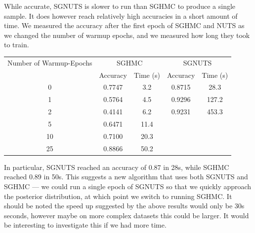 While accurate, SGNUTS is slower to run than SGHMC to produce a single sample. It does however reach relatively high accuracies in a short amount of time. We measured the accuracy after the first epoch of SGHMC and NUTS as we changed the number of warmup epochs, and we measured how long they took to train.

\begin{center}
\begin{tabular}{ccccc} 
\hline
Number of Warmup-Epochs &\multicolumn{2}{c}{SGHMC}& \multicolumn{2}{c}{SGNUTS} \\
& Accuracy & Time (s) & Accuracy & Time (s) \\
 \hline
 0 &0.7747  &  3.2&0.8715&28.3\\ 
 1 & 0.5764 & 4.5 &0.9296&127.2\\ 
 2 & 0.4141 & 6.2&0.9231&453.3\\ 
 5 &0.6471& 11.4 &&\\ 
 10 &0.7100& 20.3 &&\\ 
 25 &0.8866& 50.2 &&\\ 
 \hline
\end{tabular}
\end{center}

In particular, SGNUTS reached an accuracy of 0.87 in 28s, while SGHMC reached 0.89 in 50s. This suggests a new algorithm that uses both SGNUTS and SGHMC — we could run a single epoch of SGNUTS so that we quickly approach the posterior distribution, at which point we switch to running SGHMC. It should be noted the speed up suggested by the above results would only be 30s seconds, however maybe on more complex datasets this could be larger. It would be interesting to investigate this if we had more time.